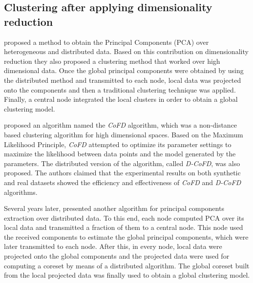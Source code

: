 \documentclass[10pt]{article}
\begin{document}
\subsection{Clustering after applying dimensionality reduction}

\citep{KHSJ01} proposed a method to obtain the Principal Components (PCA) over heterogeneous and distributed data. Based on this contribution on dimensionality reduction they also proposed a clustering method that worked over high dimensional data. Once the global principal components were obtained by using the distributed method and transmitted to each node, local data was projected onto the components and then a traditional clustering technique was applied. Finally, a central node
integrated the local clusters in order to obtain a global clustering model.

\citep{LZO03} proposed an algorithm named the \textit{CoFD} algorithm, which was a non-distance based clustering algorithm for high dimensional spaces. Based on the Maximum Likelihood Principle, \textit{CoFD} attempted to optimize its parameter settings to maximize the likelihood between data points and the model generated by the parameters. The distributed version of the algorithm, called \textit{D-CoFD}, was also proposed. The authors claimed that the experimental results on both synthetic and real datasets showed the efficiency and effectiveness of \textit{CoFD} and \textit{D-CoFD} algorithms.

Several years later, \citep{LBK13} presented another algorithm for principal components extraction over distributed data. To this end, each node computed PCA over its local data and transmitted a fraction of them to a central node. This node used the received components to estimate the global principal components, which were later transmitted to each node. After this, in every node, local data were projected onto the global components and the projected data were used for computing a coreset by means of a distributed algorithm. The global coreset built from the local projected data was finally used to obtain a global clustering model.  
\end{document}
